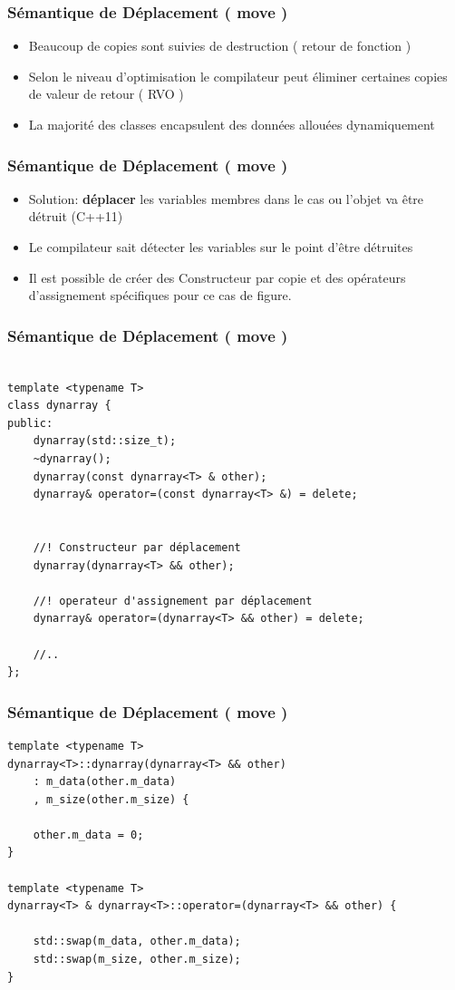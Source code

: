 \documentclass[xetex,mathserif]{beamer}
\begin{document}
\begin{frame}[fragile]
\frametitle{Sémantique de Déplacement ( move )}
\begin{itemize} 
	\item Beaucoup de copies sont suivies de destruction ( retour de fonction )
	\pause
	\item Selon le niveau d'optimisation le compilateur peut éliminer certaines copies de valeur de retour ( RVO )
	\pause
	\item La majorité des classes encapsulent des données allouées dynamiquement
\end{itemize}
\end{frame}

\begin{frame}[fragile]
\frametitle{Sémantique de Déplacement ( move )}
\begin{itemize} 
	\item Solution: \textbf{déplacer} les variables membres dans le cas ou l'objet va être détruit (C++11)
	\pause
	\item Le compilateur sait détecter les variables sur le point d'être détruites
	\pause
	\item Il est possible de créer des Constructeur par copie et des opérateurs d'assignement spécifiques pour ce cas de figure.
\end{itemize}
\end{frame}


\begin{frame}[containsverbatim]
\frametitle{Sémantique de Déplacement ( move )}
\begin{lstlisting}

template <typename T>
class dynarray {
public:
	dynarray(std::size_t);
	~dynarray();
	dynarray(const dynarray<T> & other);
	dynarray& operator=(const dynarray<T> &) = delete;
	
	
	//! Constructeur par déplacement
	dynarray(dynarray<T> && other); 
	
	//! operateur d'assignement par déplacement
	dynarray& operator=(dynarray<T> && other) = delete;
	
	//..
};
\end{lstlisting}
\end{frame}


\begin{frame}[containsverbatim]
\frametitle{Sémantique de Déplacement ( move )}
\begin{lstlisting} 
template <typename T>
dynarray<T>::dynarray(dynarray<T> && other)
	: m_data(other.m_data)
	, m_size(other.m_size) {
	
	other.m_data = 0;
}

template <typename T>
dynarray<T> & dynarray<T>::operator=(dynarray<T> && other) {

	std::swap(m_data, other.m_data);
	std::swap(m_size, other.m_size);
}
\end{lstlisting}
\end{frame}
\end{document}
